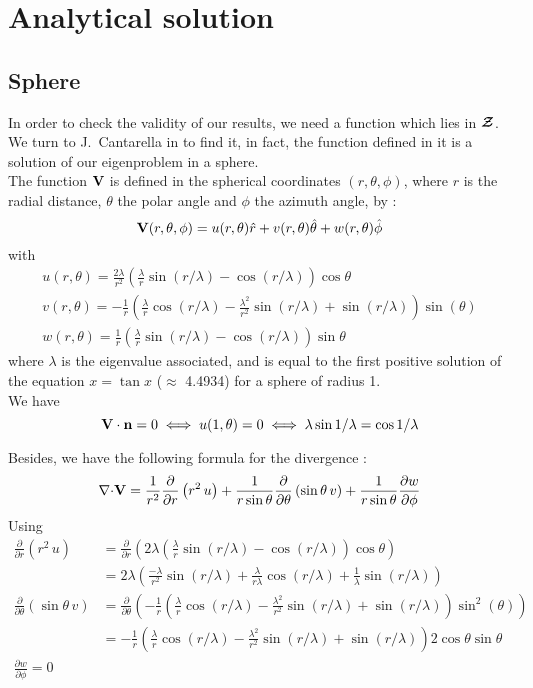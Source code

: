 \section{Analytical solution}
\subsection{Sphere}
In order to check the validity of our results, we need a function which lies in
${\bm{\mathcal{Z}}}$. We turn to J.~Cantarella in \cite{Cantarella2000} to find it, in fact,
the function defined in it is a solution of our eigenproblem in a sphere.\\
The function ${\mathbf{V}}$ is defined in the spherical coordinates $(r,\theta,\phi)$, where
$r$ is the radial distance, $\theta$ the polar angle and $\phi$ the azimuth 
angle, by :
\begin{equation} {\mathbf{V}}(r,\theta,\phi) = u(r,\theta)\hat{r} + v(r,\theta)\hat{\theta} + w(r,\theta)\hat{\phi} \end{equation}
with
\begin{gather}
u(r,\theta) =
\frac{2\lambda}{r^2}\left(\frac{\lambda}{r}\sin(r/\lambda)-\cos(r/\lambda)\right)\cos\theta\\
v(r,\theta) = -\frac{1}{r}\left(\frac{\lambda}{r}\cos(r/\lambda) -
  \frac{\lambda^2}{r^2}\sin(r/\lambda) + \sin(r/\lambda)\right)\sin(\theta)\\
w(r,\theta) = \frac{1}{r}\left(\frac{\lambda}{r}\sin(r/\lambda) - \cos(r/\lambda)\right)\sin\theta
\end{gather}
where $\lambda$ is the eigenvalue associated, and is equal to the first positive
solution of the equation $x=\tan x$ ($\approx$ 4.4934) for a sphere of radius
1.\\

We have \[ {\mathbf{V}}\cdot{\mathbf{n}} = 0 \iff u(1,\theta)=0 \iff \lambda\sin 1/\lambda
= \cos 1/\lambda \]

Besides, we have the following formula for the divergence :
\[ {\nabla\cdot} {\mathbf{V}} = \frac{1}{r^2}\frac{\partial}{\partial
  r}\left(r^2\,u\right) +
\frac{1}{r\sin\theta}\frac{\partial}{\partial\theta}\left(\sin\theta\,v\right)
+ \frac{1}{r\sin\theta}\frac{\partial w}{\partial\phi} \]
Using 
\begin{align*}
\frac{\partial}{\partial r}\left(r^2\,u\right) &= \frac{\partial}{\partial
  r}\left(
  2\lambda\left(\frac{\lambda}{r}\sin(r/\lambda)-\cos(r/\lambda)\right)\cos\theta\right)\\
&=
2\lambda\left(\frac{-\lambda}{r^2}\sin(r/\lambda) + \frac{\lambda}{r\lambda}\cos(r/\lambda)
  + \frac{1}{\lambda}\sin(r/\lambda)\right)\\
\frac{\partial}{\partial\theta}\left(\sin\theta\,v\right) &=
\frac{\partial}{\partial\theta}\left(
  -\frac{1}{r}\left(\frac{\lambda}{r}\cos(r/\lambda) -
    \frac{\lambda^2}{r^2}\sin(r/\lambda) +
    \sin(r/\lambda)\right)\sin^2(\theta)\right)\\
&= -\frac{1}{r}\left(\frac{\lambda}{r}\cos(r/\lambda) -
    \frac{\lambda^2}{r^2}\sin(r/\lambda) +
    \sin(r/\lambda)\right)2\cos\theta\sin\theta\\
\frac{\partial w}{\partial\phi} = 0
\end{align*}

